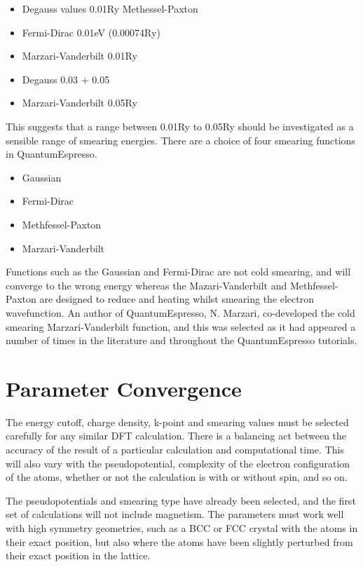 \begin{itemize}
\item Degauss values 0.01Ry Methessel-Paxton \cite{AdsorptionBR2}
\item Fermi-Dirac 0.01eV (0.00074Ry) \cite{NaDiffusion}
\item Marzari-Vanderbilt 0.01Ry \cite{ScBiandYBi}
\item Degauss 0.03 + 0.05 \cite{CuandPd}
\item Marzari-Vanderbilt 0.05Ry \cite{ecHeuslerAlloy}
\end{itemize}

This suggests that a range between 0.01Ry to 0.05Ry should be investigated as a sensible range of smearing energies.  There are a choice of four smearing functions in QuantumEspresso.

\begin{itemize}
\item Gaussian
\item Fermi-Dirac
\item Methfessel-Paxton
\item Marzari-Vanderbilt
\end{itemize}

Functions such as the Gaussian and Fermi-Dirac are not cold smearing, and will converge to the wrong energy whereas the Mazari-Vanderbilt and Methfessel-Paxton are designed to reduce and heating whilst smearing the electron wavefunction.  An author of QuantumEspresso, N. Marzari, co-developed the cold smearing Marzari-Vanderbilt function, and this was selected as it had appeared a number of times in the literature and throughout the QuantumEspresso tutorials.  






\section{Parameter Convergence}

The energy cutoff, charge density, k-point and smearing values must be selected carefully for any similar DFT calculation.  There is a balancing act between the accuracy of the result of a particular calculation and computational time.  This will also vary with the pseudopotential, complexity of the electron configuration of the atoms, whether or not the calculation is with or without spin, and so on.

The pseudopotentials and smearing type have already been selected, and the first set of calculations will not include magnetism.  The parameters must work well with high symmetry geometries, such as a BCC or FCC crystal with the atoms in their exact position, but also where the atoms have been slightly perturbed from their exact position in the lattice.

